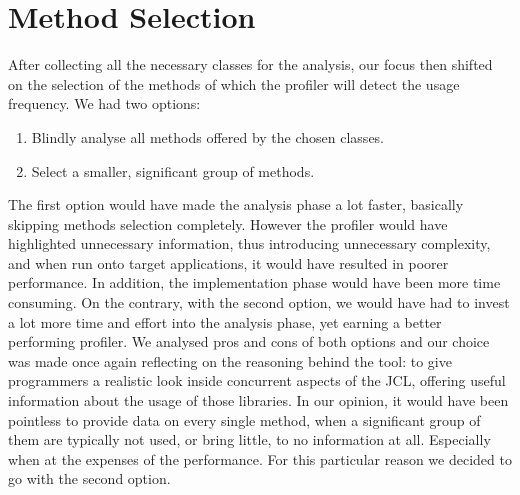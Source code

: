 \documentclass[]{usiinfthesis}
\begin{document}
\section{Method Selection} \label{sec:4.2}
After collecting all the necessary classes for the analysis, our focus then shifted on the selection of the methods of which the profiler will detect the usage frequency. We had two options:
\begin{enumerate}
    \item Blindly analyse all methods offered by the chosen classes.
    \item Select a smaller, significant group of methods.
\end{enumerate}
 The first option would have made the analysis phase a lot faster, basically skipping methods selection completely. However the profiler would have highlighted unnecessary information, thus introducing unnecessary complexity, and when run onto target applications, it would have resulted in poorer performance. In addition, the implementation phase would have been more time consuming. On the contrary, with the second option, we would have had to invest a lot more time and effort into the analysis phase, yet earning a better performing profiler. We analysed pros and cons of both options and our choice was made once again reflecting on the reasoning behind the tool: to give programmers a realistic look inside concurrent aspects of the JCL, offering useful information about the usage of those libraries. In our opinion, it would have been pointless to provide data on every single method, when a significant group of them are typically not used, or bring little, to no information at all. Especially when at the expenses of the performance. For this particular reason we decided to go with the second option.
 
\end{document}
